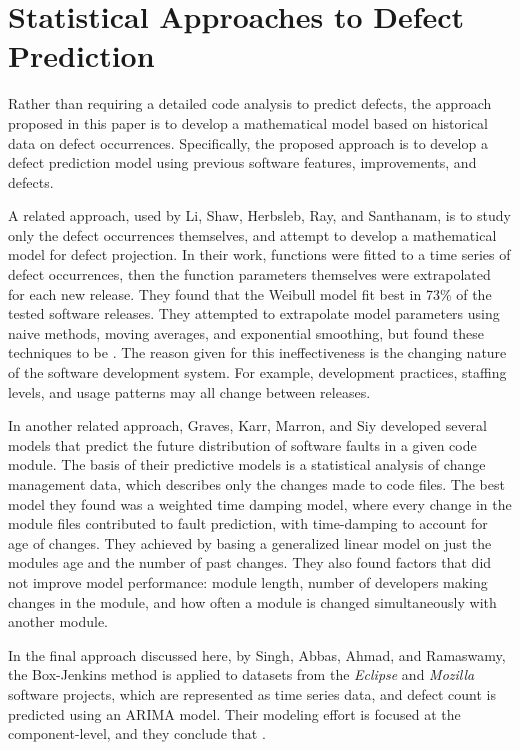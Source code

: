 \documentclass[letterpaper]{report}
\begin{document}
\section*{Statistical Approaches to Defect Prediction}
Rather than requiring a detailed code analysis to predict defects, the approach proposed in this paper is to develop a mathematical model based on historical data on defect occurrences. Specifically, the proposed approach is to develop a defect prediction model using previous software features, improvements, and defects.

A related approach, used by Li, Shaw, Herbsleb, Ray, and Santhanam\cite{2004_li_emperical_eval}, is to study only the defect occurrences themselves, and attempt to develop a mathematical model for defect projection. In their work, functions were fitted to a time series of defect occurrences, then the function parameters themselves were extrapolated for each new release. They found that the Weibull model fit best in 73\% of the tested software releases. They attempted to extrapolate model parameters using naive methods, moving averages, and exponential smoothing, but found these techniques to be . The reason given for this ineffectiveness is the changing nature of the software development system. For example, development practices, staffing levels, and usage patterns may all change between releases.

In another related approach, Graves, Karr, Marron, and Siy\cite{2000_graves_predicting} developed several models that predict the future distribution of software faults in a given code module. The basis of their predictive models is a statistical analysis of change management data, which describes only the changes made to code files. The best model they found was a weighted time damping model, where every change in the module files contributed to fault prediction, with time-damping to account for age of changes. They achieved  by basing a generalized linear model on just the modules age and the number of past changes. They also found factors that did not improve model performance: module length, number of developers making changes in the module, and how often a module is changed simultaneously with another module.

In the final approach discussed here, by Singh, Abbas, Ahmad, and Ramaswamy\cite{2010_singh_predicting}, the Box-Jenkins method is applied to datasets from the \textit{Eclipse} and \textit{Mozilla} software projects, which are represented as time series data, and defect count is predicted using an ARIMA model. Their modeling effort is focused at the component-level, and they conclude that .
\end{document}
